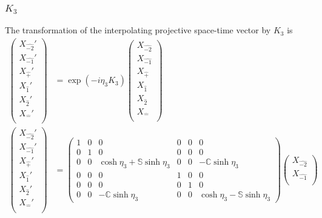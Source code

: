 \documentclass[foundations,article,submit,pdftex,moreauthors]{Definitions/mdpi}
\begin{document}
\subsubsection{\texorpdfstring{$K_{3}$}{K3}}
The transformation of the interpolating projective
space-time vector by $K_{3}$ is
\begin{align}
\begin{pmatrix}
    {X}_{\hat{-2}}'\\
    {X}_{\hat{-1}}'\\
    {X}_{\hat{+}}'\\
    {X}_{\hat{1}}'\\
    {X}_{\hat{2}}'\\
    {X}_{\hat{-}}'\\
    \end{pmatrix}&= \exp{(-i\eta_{3}K_{3})}\begin{pmatrix}
    {X}_{\hat{-2}}\\
    {X}_{\hat{-1}}\\
    {X}_{\hat{+}}\\
    {X}_{\hat{1}}\\
    {X}_{\hat{2}}\\
    {X}_{\hat{-}}\\
    \end{pmatrix}\\
    \begin{pmatrix}
    {X}_{\hat{-2}}'\\
    {X}_{\hat{-1}}'\\
    {X}_{\hat{+}}'\\
    {X}_{\hat{1}}'\\
    {X}_{\hat{2}}'\\
    {X}_{\hat{-}}'\\
    \end{pmatrix}&= \begin{pmatrix}
        1&0&0&0&0&0\\
        0&1&0&0&0&0\\
        0&0&\cosh{\eta_{3}}+\mathbb{S}\sinh{\eta_{3}}&0&0&-\mathbb{C}\sinh{\eta_{3}}\\
        0&0&0&1&0&0\\
        0&0&0&0&1&0\\
        0&0&-\mathbb{C}\sinh{\eta_{3}}&0&0&\cosh{\eta_{3}}-\mathbb{S}\sinh{\eta_{3}}
    \end{pmatrix}\begin{pmatrix}
    {X}_{\hat{-2}}\\
    {X}_{\hat{-1}}\\

\end{pmatrix}
\end{align}
\end{document}
